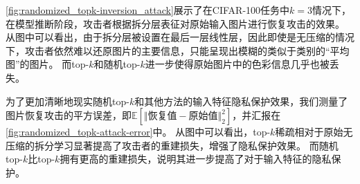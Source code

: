 \autoref{fig:randomized_topk-inversion_attack}展示了在CIFAR-100任务中$k=3$情况下，在模型推断阶段，攻击者根据拆分层表征对原始输入图片进行恢复攻击的效果。
从图中可以看出，由于拆分层被设置在最后一层线性层，因此即使是无压缩的情况下，攻击者依然难以还原图片的主要信息，只能呈现出模糊的类似于类别的“平均图”的图片。
%
而top-$k$和随机top-$k$进一步使得原始图片中的色彩信息几乎也被丢失。
%

为了更加清晰地现实随机top-$k$和其他方法的输入特征隐私保护效果，我们测量了图片恢复攻击的平方误差，即$\mathbb E\left[ \Vert \text{恢复值} - \text{原始值} \Vert_2^2 \right]$，并汇报在\autoref{fig:randomized_topk-attack-error}中。
%
从图中可以看出，top-$k$稀疏相对于原始无压缩的拆分学习显著提高了攻击者的重建损失，增强了隐私保护效果。
而随机top-$k$比top-$k$拥有更高的重建损失，说明其进一步提高了对于输入特征的隐私保护。


